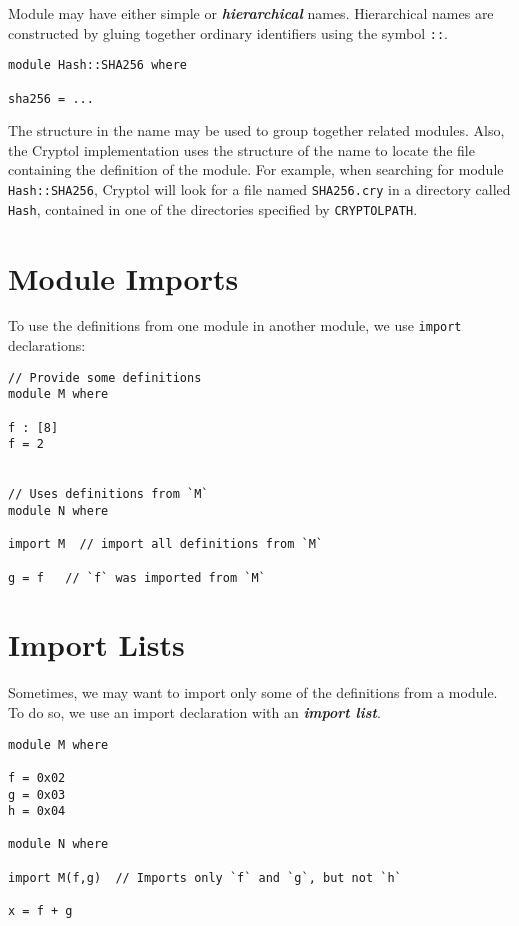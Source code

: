 Module may have either simple or \textbf{\emph{hierarchical}} names.
Hierarchical names are constructed by gluing together ordinary
identifiers using the symbol \texttt{::}.

\begin{verbatim}
module Hash::SHA256 where

sha256 = ...
\end{verbatim}

The structure in the name may be used to group together related modules.
Also, the Cryptol implementation uses the structure of the name to
locate the file containing the definition of the module. For example,
when searching for module \texttt{Hash::SHA256}, Cryptol will look for a
file named \texttt{SHA256.cry} in a directory called \texttt{Hash},
contained in one of the directories specified by \texttt{CRYPTOLPATH}.

\hypertarget{module-imports}{%
\section{Module Imports}\label{module-imports}}

To use the definitions from one module in another module, we use
\texttt{import} declarations:

\begin{verbatim}
// Provide some definitions
module M where

f : [8]
f = 2


// Uses definitions from `M`
module N where

import M  // import all definitions from `M`

g = f   // `f` was imported from `M`
\end{verbatim}

\hypertarget{import-lists}{%
\section{Import Lists}\label{import-lists}}

Sometimes, we may want to import only some of the definitions from a
module. To do so, we use an import declaration with an
\textbf{\emph{import list}}.

\begin{verbatim}
module M where

f = 0x02
g = 0x03
h = 0x04

module N where

import M(f,g)  // Imports only `f` and `g`, but not `h`

x = f + g
\end{verbatim}

